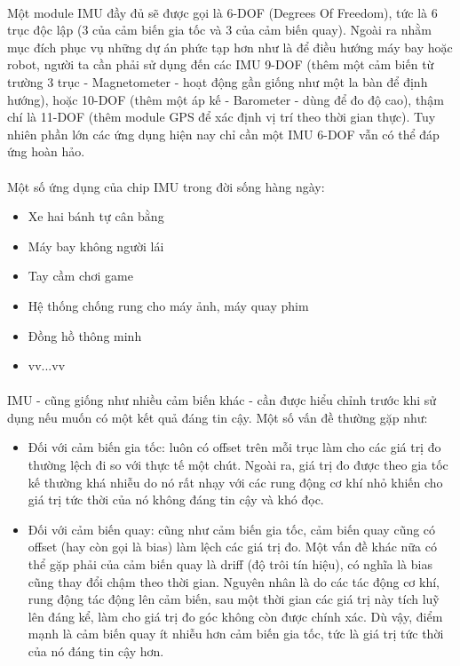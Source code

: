 \paragraph{}Một module IMU đầy đủ sẽ được gọi là 6-DOF (Degrees Of Freedom), tức là 6 trục độc lập (3 của cảm biến gia tốc và 3 của cảm biến quay). Ngoài ra nhằm mục đích phục vụ những dự án phức tạp hơn như là để điều hướng máy bay hoặc robot, người ta cần phải sử dụng đến các IMU 9-DOF (thêm một cảm biến từ trường 3 trục - Magnetometer - hoạt động gần giống như một la bàn để định hướng), hoặc 10-DOF (thêm một áp kế - Barometer - dùng để đo độ cao), thậm chí là 11-DOF (thêm module GPS để xác định vị trí theo thời gian thực). Tuy nhiên phần lớn các ứng dụng hiện nay chỉ cần một IMU 6-DOF vẫn có thể đáp ứng hoàn hảo. 
\paragraph{}Một số ứng dụng của chip IMU trong đời sống hàng ngày:
\begin{itemize}
	\item Xe hai bánh tự cân bằng
	\item Máy bay không người lái
	\item Tay cầm chơi game
	\item Hệ thống chống rung cho máy ảnh, máy quay phim
	\item Đồng hồ thông minh
	\item vv...vv
\end{itemize}
\paragraph{}IMU - cũng giống như nhiều cảm biến khác - cần được hiểu chỉnh trước khi sử dụng nếu muốn có một kết quả đáng tin cậy. Một số vấn đề thường gặp như:
\begin{itemize}
	\item Đối với cảm biến gia tốc: luôn có offset trên mỗi trục làm cho các giá trị đo thường lệch đi so với thực tế một chút. Ngoài ra, giá trị đo được theo gia tốc kế thường khá nhiễu do nó rất nhạy với các rung động cơ khí nhỏ khiến cho giá trị tức thời của nó không đáng tin cậy và khó đọc. 
	\item Đối với cảm biến quay: cũng như cảm biến gia tốc, cảm biến quay cũng có offset (hay còn gọi là bias) làm lệch các giá trị đo. Một vấn đề khác nữa có thể gặp phải của cảm biến quay là driff (độ trôi tín hiệu), có nghĩa là bias cũng thay đổi chậm theo thời gian. Nguyên nhân là do các tác động cơ khí, rung động tác động lên cảm biến, sau một thời gian các giá trị này tích luỹ lên đáng kể, làm cho giá trị đo góc không còn được chính xác. Dù vậy, điểm mạnh là cảm biến quay ít nhiễu hơn cảm biến gia tốc, tức là giá trị tức thời của nó đáng tin cậy hơn. 
\end{itemize}

